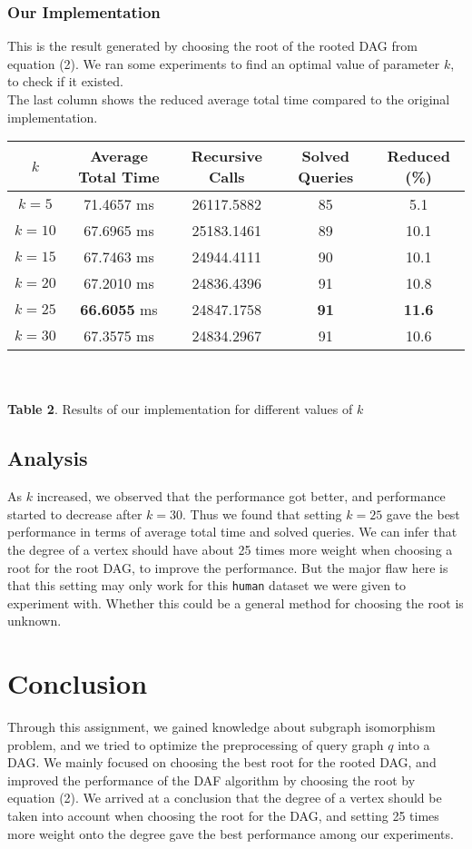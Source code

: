 \documentclass[12pt]{article}
\begin{document}
\subsubsection{Our Implementation}
This is the result generated by choosing the root of the rooted DAG from equation (2). We ran some experiments to find an optimal value of parameter $k$, to check if it existed.\\
The last column shows the reduced average total time compared to the original implementation.
\begin{center}
	\begin{tabular}{|c|c|c|c|c|}
		\hline
		$k$ & Average Total Time & Recursive Calls & Solved Queries & Reduced (\%) \\ \hline
		$k=5$ & 71.4657 ms & 26117.5882 & 85 & 5.1\\ \hline
		$k=10$ & 67.6965 ms& 25183.1461& 89 & 10.1\\ \hline
		$k=15$ & 67.7463 ms& 24944.4111& 90& 10.1\\ \hline
		$k=20$ & 67.2010 ms& 24836.4396& 91& 10.8\\ \hline
		$k=25$ & \textbf{66.6055} ms& 24847.1758& \textbf{91}& \textbf{11.6}\\ \hline
		$k=30$ & 67.3575 ms & 24834.2967 & 91 & 10.6\\\hline
	\end{tabular}\\~\\
\textbf{Table 2}. Results of our implementation for different values of $k$
\end{center}

\subsection{Analysis}
As $k$ increased, we observed that the performance got better, and performance started to decrease after $k=30$. Thus we found that setting $k=25$ gave the best performance in terms of average total time and solved queries. We can infer that the degree of a vertex should have about 25 times more weight when choosing a root for the root DAG, to improve the performance. But the major flaw here is that this setting may only work for this \texttt{human} dataset we were given to experiment with. Whether this could be a general method for choosing the root is unknown.

\section{Conclusion}
Through this assignment, we gained knowledge about subgraph isomorphism problem, and we tried to optimize the preprocessing of query graph $q$ into a DAG. We mainly focused on choosing the best root for the rooted DAG, and improved the performance of the DAF algorithm by choosing the root by equation (2). We arrived at a conclusion that the degree of a vertex should be taken into account when choosing the root for the DAG, and setting 25 times more weight onto the degree gave the best performance among our experiments.
\end{document}

